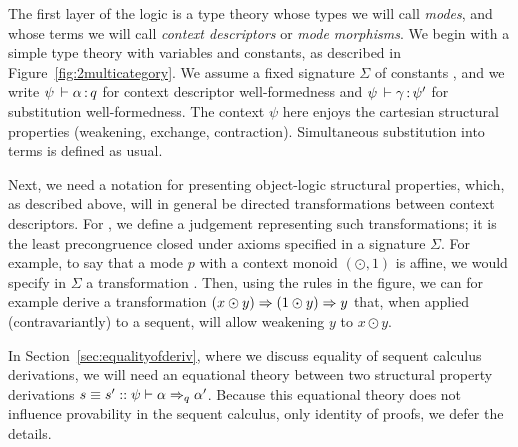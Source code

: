 The first layer of the logic is a type theory whose types we will call
\emph{modes}, and whose terms we will call \emph{context descriptors} or
\emph{mode morphisms}.  We begin with a simple type theory with
variables and constants, as described in
Figure~\ref{fig:2multicategory}.  We assume a fixed signature $\Sigma$
of constants , and we write $\oftp{\psi}{\alpha}{q}$ for context
descriptor well-formedness and $\oftp{\psi}{\gamma}{\psi'}$ for
substitution well-formedness.  The context $\psi$ here enjoys the
cartesian structural properties (weakening, exchange, contraction).
Simultaneous substitution into terms is defined as usual.

Next, we need a notation for presenting object-logic structural
properties, which, as described above, will in general be directed
transformations between context descriptors.  For
, we define a judgement
     {} representing such
     transformations; it is the least precongruence closed under axioms
     specified in a signature $\Sigma$.  For example, to say that a mode
     $p$ with a context monoid $(\odot,1)$ is affine, we would specify
     in $\Sigma$ a transformation .  Then, using the
     rules in the figure, we can for example derive a transformation $(x
     \odot y) \spr (1 \odot y) \spr y$ that, when applied
     (contravariantly) to a sequent, will allow weakening $y$ to $x
     \odot y$.

In Section~\ref{sec:equalityofderiv}, where we discuss equality of
sequent calculus derivations, we will need an equational theory between
two structural property derivations $s \deq s' ::
\wfsp{\psi}{\alpha}{\alpha'}{q}$.  Because this equational theory does
not influence provability in the sequent calculus, only identity of
proofs, we defer the details.


